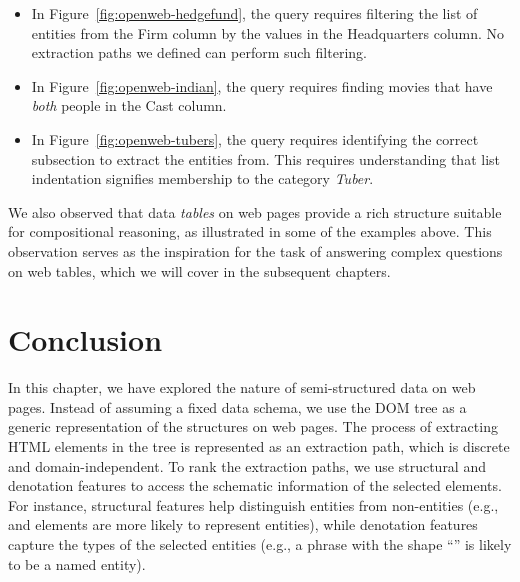 \begin{itemize}
\item In Figure~\ref{fig:openweb-hedgefund},
the query 
requires filtering the list of entities from
the Firm column by the values in the Headquarters column.
No extraction paths we defined can perform such filtering.


\item In Figure~\ref{fig:openweb-indian},
the query 
requires finding movies that
have \emph{both} people in the Cast column.

\item In Figure~\ref{fig:openweb-tubers},
the query 
requires identifying the correct subsection to extract
the entities from.
This requires understanding that list indentation
signifies membership to the category \emph{Tuber}.

\end{itemize}

We also observed that
data \emph{tables} on web pages provide a rich structure
suitable for compositional reasoning,
as illustrated in some of the examples above.
This observation serves as the inspiration
for the task of answering complex questions on web tables,
which we will cover in the subsequent chapters.

\section{Conclusion}

In this chapter,
we have explored the nature of semi-structured data
on web pages.
Instead of assuming a fixed data schema,
we use the DOM tree as a generic representation of the structures
on web pages.
The process of extracting HTML elements in the tree
is represented as an extraction path,
which is discrete and domain-independent.
To rank the extraction paths,
we use
structural and denotation features to
access the schematic information of the selected elements.
For instance,  structural features
help distinguish entities from non-entities
(e.g.,  and  elements are more likely
to represent entities),
while  denotation features
capture the types of the selected entities
(e.g., a phrase with the shape ``''
is likely to be a named entity).

